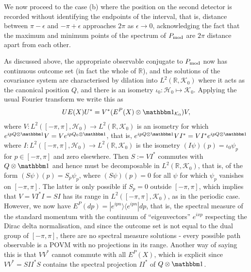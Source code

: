 We now proceed to the case (b) where the position on the second detector is recorded without identifying the endpoints of the interval, that is, distance between $\pi-\epsilon$ and $-\pi+\epsilon$ approaches $2\pi$ as $\epsilon\rightarrow 0$, acknowledging the fact that the maximum and minimum points of the spectrum of $P_{\mathrm{mod}}$ are $2\pi$ distance apart from each other.

As discussed above, the appropriate observable conjugate to $P_{\mathrm{mod}}$ now has continuous outcome set (in fact the whole of $\mathbb R$), and the solutions of the covariance system are characterised by dilation into $L^2(\mathbb R, \mathcal K_0)$ where it acts as the canonical position $Q$, and there is an isometry $\iota_0:\mathcal H_0\mapsto \mathcal K_0$. Applying the usual Fourier transform we write this as 
\begin{align}
UE(X)U^* = V^* (E^P(X)\otimes \id_{\mathcal K_0})V,
\end{align}
where $V:L^2([-\pi,\pi], \mathcal H_0)\to L^2(\mathbb R, \mathcal K_0)$ is an isometry for which $e^{ip Q\otimes \id}V=Ve^{ipQ_0\otimes \id}$, that is, $e^{ip Q\otimes \id}VI^* =VI^*e^{ipQ\otimes \id}$ where $I:L^2([-\pi,\pi], \mathcal H_0)\to L^2(\mathbb R, \mathcal K_0)$ is the isometry $(I\psi)(p) = \iota_0\psi_p$ for $p\in [-\pi,\pi]$ and zero elsewhere. Then $S:=VI^*$ commutes with $Q\otimes \id$ and hence must be decomposable in $L^2(\mathbb R,\mathcal K_0)$, that is, of the form $(S\psi)(p) = S_p\psi_p$, where $(S\psi)(p)=0$ for all $\psi$ for which $\psi_p$ vanishes on $[-\pi,\pi]$. The latter is only possible if $S_p=0$ outside $[-\pi,\pi]$, which implies that $V = VI^*I = SI$ has its range in $L^2([-\pi,\pi], \mathcal K_0)$, as in the periodic case. However, we now have $E^P(dp)=|e^{ipn}\rangle\langle e^{ipn}| dp$, that is, the spectral measure of the standard momentum with the continuum of ``eigenvectors'' $e^{ixp}$ respecting the Dirac delta normalisation, and since the outcome set is not equal to the dual group of $[-\pi,\pi]$, there are no spectral measure solutions - every possible path observable is a POVM with no projections in its range. Another way of saying this is that $VV^*$ cannot commute with all $E^P(X)$, which is explicit since $VV^*=SII^*S$ contains the spectral projection $II^*$ of $Q\otimes \id$.

